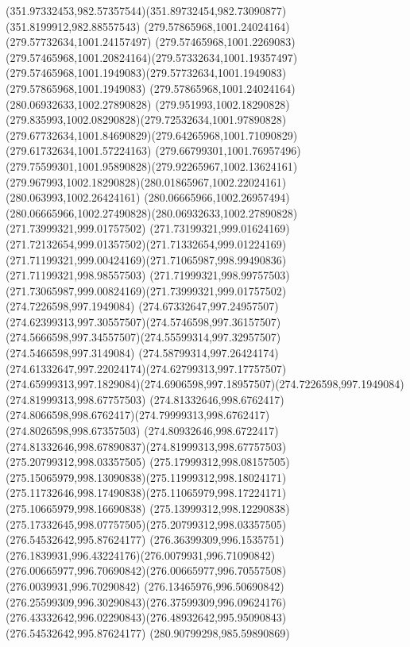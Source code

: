 {{  \curveto(351.97332453,982.57357544)(351.89732454,982.73090877)(351.8199912,982.88557543)
  \moveto(279.57865968,1001.24024164)
  \lineto(279.57732634,1001.24157497)
  \curveto(279.57465968,1001.2269083)(279.57465968,1001.20824164)(279.57332634,1001.19357497)
  \curveto(279.57465968,1001.1949083)(279.57732634,1001.1949083)(279.57865968,1001.1949083)
  \lineto(279.57865968,1001.24024164)
  \moveto(280.06932633,1002.27890828)
  \curveto(279.951993,1002.18290828)(279.835993,1002.08290828)(279.72532634,1001.97890828)
  \curveto(279.67732634,1001.84690829)(279.64265968,1001.71090829)(279.61732634,1001.57224163)
  \curveto(279.66799301,1001.76957496)(279.75599301,1001.95890828)(279.92265967,1002.13624161)
  \curveto(279.967993,1002.18290828)(280.01865967,1002.22024161)(280.063993,1002.26424161)
  \curveto(280.06665966,1002.26957494)(280.06665966,1002.27490828)(280.06932633,1002.27890828)
  \moveto(271.73999321,999.01757502)
  \curveto(271.73199321,999.01624169)(271.72132654,999.01357502)(271.71332654,999.01224169)
  \curveto(271.71199321,999.00424169)(271.71065987,998.99490836)(271.71199321,998.98557503)
  \curveto(271.71999321,998.99757503)(271.73065987,999.00824169)(271.73999321,999.01757502)
  \moveto(274.7226598,997.1949084)
  \curveto(274.67332647,997.24957507)(274.62399313,997.30557507)(274.5746598,997.36157507)
  \curveto(274.5666598,997.34557507)(274.55599314,997.32957507)(274.5466598,997.3149084)
  \curveto(274.58799314,997.26424174)(274.61332647,997.22024174)(274.62799313,997.17757507)
  \curveto(274.65999313,997.1829084)(274.6906598,997.18957507)(274.7226598,997.1949084)
  \moveto(274.81999313,998.67757503)
  \curveto(274.81332646,998.6762417)(274.8066598,998.6762417)(274.79999313,998.6762417)
  \lineto(274.8026598,998.67357503)
  \curveto(274.80932646,998.6722417)(274.81332646,998.67890837)(274.81999313,998.67757503)
  \moveto(275.20799312,998.03357505)
  \curveto(275.17999312,998.08157505)(275.15065979,998.13090838)(275.11999312,998.18024171)
  \curveto(275.11732646,998.17490838)(275.11065979,998.17224171)(275.10665979,998.16690838)
  \curveto(275.13999312,998.12290838)(275.17332645,998.07757505)(275.20799312,998.03357505)
  \moveto(276.54532642,995.87624177)
  \curveto(276.36399309,996.1535751)(276.1839931,996.43224176)(276.0079931,996.71090842)
  \curveto(276.00665977,996.70690842)(276.00665977,996.70557508)(276.0039931,996.70290842)
  \curveto(276.13465976,996.50690842)(276.25599309,996.30290843)(276.37599309,996.09624176)
  \curveto(276.43332642,996.02290843)(276.48932642,995.95090843)(276.54532642,995.87624177)
  \moveto(280.90799298,985.59890869)
}}
